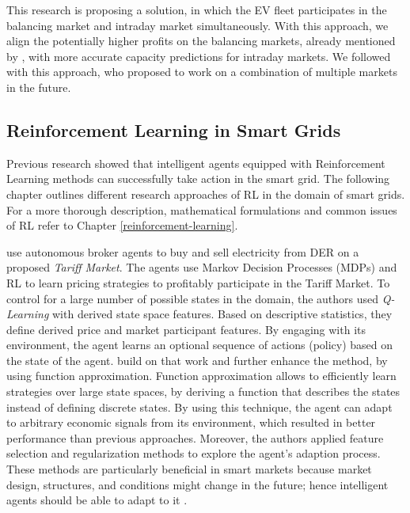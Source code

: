 \documentclass[12pt, article]{article}
\begin{document}
This research is proposing a solution, in which the EV fleet participates in the
balancing market and intraday market simultaneously. With this approach, we
align the potentially higher profits on the balancing markets, already mentioned
by \textcite{tomic07_using_fleet_elect_drive_vehic_grid_suppor}, with more
accurate capacity predictions for intraday markets. We followed
\textcite{kahlen17_fleet} with this approach, who proposed to work on a combination
of multiple markets in the future.

\subsection{Reinforcement Learning in Smart Grids}
\label{sec:org8437173}

Previous research showed that intelligent agents equipped with Reinforcement
Learning methods can successfully take action in the smart grid. The following
chapter outlines different research approaches of RL in the domain of smart
grids. For a more thorough description, mathematical formulations and common
issues of RL refer to Chapter \ref{reinforcement-learning}.

\textcite{reddy11_learn_behav_multip_auton_agent,reddy11_strat} use autonomous
broker agents to buy and sell electricity from DER on a proposed \emph{Tariff
Market}. The agents use Markov Decision Processes (MDPs) and RL to learn pricing
strategies to profitably participate in the Tariff Market. To control for a
large number of possible states in the domain, the authors used \emph{Q-Learning}
with derived state space features. Based on descriptive statistics, they define
derived price and market participant features. By engaging with its
environment, the agent learns an optional sequence of actions (policy) based on
the state of the agent. \textcite{peters13_reinf_learn_approac_to_auton} build on that work
and further enhance the method, by using function approximation. Function
approximation allows to efficiently learn strategies over large state spaces, by
deriving a function that describes the states instead of defining discrete
states. By using this technique, the agent can adapt to arbitrary economic
signals from its environment, which resulted in better performance than previous
approaches. Moreover, the authors applied feature selection and regularization
methods to explore the agent's adaption process. These methods are particularly
beneficial in smart markets because market design, structures, and conditions
might change in the future; hence intelligent agents should be able to adapt to
it \parencite{peters13_reinf_learn_approac_to_auton}.
\end{document}
